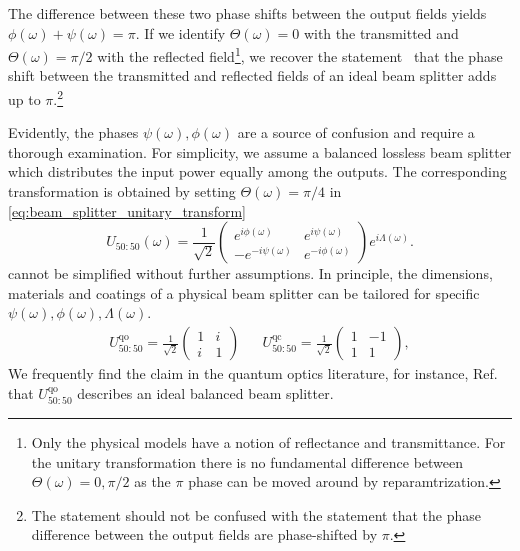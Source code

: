 The difference between these two phase shifts between the output fields yields $\phi(\omega)+\psi(\omega)=\pi$.
If we identify $\Theta(\omega)=0$ with the transmitted and $\Theta(\omega)=\pi/2$ with the reflected field\footnote{Only the physical models have a notion of reflectance and transmittance. For the unitary transformation there is no fundamental difference between $\Theta(\omega)=0,\pi/2$ as the $\pi$ phase can be moved around by reparamtrization.}, we recover the statement~\cite{Zeilinger1981} that the phase shift between the transmitted and reflected fields of an ideal beam splitter adds up to $\pi$.\footnote{The statement should not be confused with the statement that the phase difference between the output fields are phase-shifted by $\pi$.}

Evidently, the phases $\psi(\omega),\phi(\omega)$ are a source of confusion and require a thorough examination.
For simplicity, we assume a balanced lossless beam splitter which distributes the input power equally among the outputs.
The corresponding transformation is obtained by setting $\Theta(\omega)=\pi/4$ in \cref{eq:beam_splitter_unitary_transform}
\begin{equation}
	U_{50:50}(\omega)
	=
    \frac{1}{\sqrt{2}}
    \begin{pmatrix}
        e^{i\phi(\omega)} & e^{i\psi(\omega)}
        \\
        -e^{-i\psi(\omega)} & e^{-i\phi(\omega)}
    \end{pmatrix}
    e^{i\Lambda(\omega)}
    \label{eq:beam_splitter_unitary_transform_balanced}
    .
\end{equation}
 cannot be simplified without further assumptions.
In principle, the dimensions, materials and coatings of a physical beam splitter can be tailored for specific $\psi(\omega),\phi(\omega),\Lambda(\omega)$.
\begin{align}
	U_{50:50}^\text{qo}
	=
    \frac{1}{\sqrt{2}}
    \begin{pmatrix}
        1 & i\\
        i & 1
    \end{pmatrix}
    &&
	U_{50:50}^\text{qc}
	=
    \frac{1}{\sqrt{2}}
    \begin{pmatrix}
        1 & -1\\
        1 & 1
    \end{pmatrix}
    \label{eq:beam_splitter_unitary_transform_balanced_qoqc},
\end{align}
We frequently find the claim in the quantum optics literature, for instance, Ref.~\cite[p.~138]{Gerry2005} that $U_{50:50}^\text{qo}$ describes an ideal balanced beam splitter.
